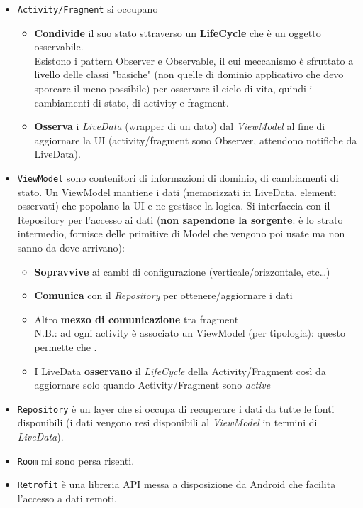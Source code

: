 \begin{itemize}
    \item \texttt{Activity/Fragment} si occupano 
    \begin{itemize}
        \item \textbf{Condivide} il suo stato sttraverso un \textbf{LifeCycle} che è un oggetto osservabile.\\
        Esistono i pattern Observer e Observable, il cui meccanismo è sfruttato a livello delle classi "basiche" (non quelle di dominio applicativo che devo sporcare il meno possibile) per osservare il ciclo di vita, quindi i cambiamenti di stato, di activity e fragment.
        \item \textbf{Osserva} i \textit{LiveData} (wrapper di un dato) dal \textit{ViewModel} al fine di aggiornare la UI (activity/fragment sono Observer, attendono notifiche da LiveData).
    \end{itemize}
    \item \texttt{ViewModel} sono contenitori di informazioni di dominio, di cambiamenti di stato. Un ViewModel mantiene i dati (memorizzati in LiveData, elementi osservati) che popolano la UI e ne gestisce la logica. Si interfaccia con il Repository per l'accesso ai dati (\textbf{non sapendone la sorgente}: è lo strato intermedio, fornisce delle primitive di Model che vengono poi usate ma non sanno da dove arrivano):
    \begin{itemize}
        \item \textbf{Sopravvive} ai cambi di configurazione (verticale/orizzontale, etc\dots)
        \item \textbf{Comunica} con il \textit{Repository} per ottenere/aggiornare i dati
        \item Altro \textbf{mezzo di comunicazione} tra fragment\\
        N.B.: ad ogni activity è associato un ViewModel (per tipologia): questo permette che .
        \item I LiveData \textbf{osservano} il \textit{LifeCycle} della Activity/Fragment così da aggiornare solo quando Activity/Fragment sono \textit{active}
    \end{itemize}
    \item \texttt{Repository} è un layer che si occupa di recuperare i dati da tutte le fonti disponibili (i dati vengono resi disponibili al \textit{ViewModel} in termini di \textit{LiveData}).
    \item \texttt{Room} mi sono persa risenti.
    \item \texttt{Retrofit} è una libreria API messa a disposizione da Android che facilita l'accesso a dati remoti.
\end{itemize}

